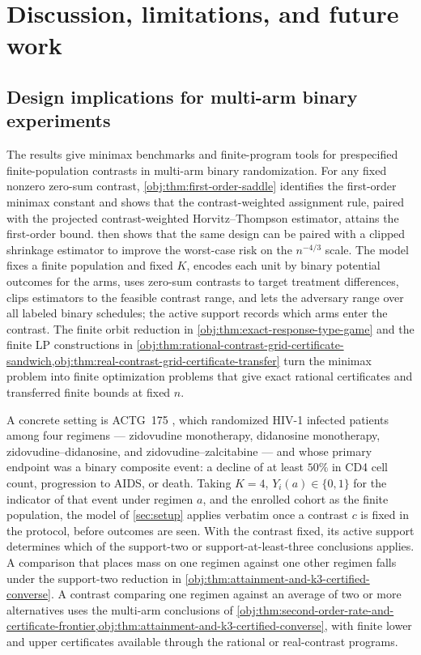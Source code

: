 \documentclass[11pt]{article}
\begin{document}
\section{Discussion, limitations, and future work}\label{sec:discussion}

\subsection{Design implications for multi-arm binary experiments}

The results give minimax benchmarks and finite-program tools for prespecified finite-population contrasts in multi-arm binary randomization. For any fixed nonzero zero-sum contrast, \cref{obj:thm:first-order-saddle} identifies the first-order minimax constant and shows that the contrast-weighted assignment rule, paired with the projected contrast-weighted Horvitz--Thompson estimator, attains the first-order bound.  then shows that the same design can be paired with a clipped shrinkage estimator to improve the worst-case risk on the \(n^{-4/3}\) scale. The model fixes a finite population and fixed \(K\), encodes each unit by binary potential outcomes for the arms, uses zero-sum contrasts to target treatment differences, clips estimators to the feasible contrast range, and lets the adversary range over all labeled binary schedules; the active support records which arms enter the contrast. The finite orbit reduction in \cref{obj:thm:exact-response-type-game} and the finite LP constructions in \cref{obj:thm:rational-contrast-grid-certificate-sandwich,obj:thm:real-contrast-grid-certificate-transfer} turn the minimax problem into finite optimization problems that give exact rational certificates and transferred finite bounds at fixed \(n\).

A concrete setting is ACTG~175 \citep{hammer_et_al_1996_actg175}, which randomized HIV-1 infected patients among four regimens --- zidovudine monotherapy, didanosine monotherapy, zidovudine--didanosine, and zidovudine--zalcitabine --- and whose primary endpoint was a binary composite event: a decline of at least \(50\%\) in CD4 cell count, progression to AIDS, or death. Taking \(K=4\), \(Y_i(a)\in\{0,1\}\) for the indicator of that event under regimen \(a\), and the enrolled cohort as the finite population, the model of \cref{sec:setup} applies verbatim once a contrast \(c\) is fixed in the protocol, before outcomes are seen. With the contrast fixed, its active support determines which of the support-two or support-at-least-three conclusions applies. A comparison that places mass on one regimen against one other regimen falls under the support-two reduction in \cref{obj:thm:attainment-and-k3-certified-converse}. A contrast comparing one regimen against an average of two or more alternatives uses the multi-arm conclusions of \cref{obj:thm:second-order-rate-and-certificate-frontier,obj:thm:attainment-and-k3-certified-converse}, with finite lower and upper certificates available through the rational or real-contrast programs.
\end{document}

